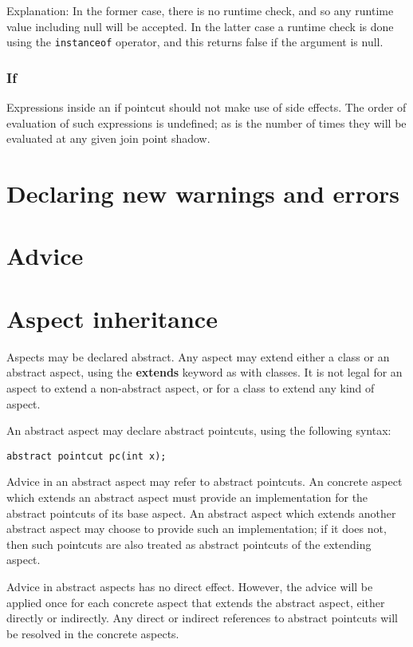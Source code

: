 \documentclass[12pt,a4paper]{report}
\begin{document}
Explanation: In the former case, there is no runtime check, and so any
runtime value including null will be accepted. In the latter case a runtime
check is done using the \verb|instanceof| operator, and this returns false
if the argument is null.


\subsection{If}
Expressions inside an if pointcut should not make use of side effects. 
The order of evaluation of such expressions is undefined; as is the number
of times they will be evaluated at any given join point shadow.

\chapter{Declaring new warnings and errors}

\chapter{Advice}

\chapter{Aspect inheritance}
Aspects may be declared abstract. Any aspect may extend either a class
or an abstract aspect, using the {\bf extends} keyword as with classes.
It is not legal for an aspect to extend a non-abstract aspect, or
for a class to extend any kind of aspect.

An abstract aspect may declare abstract pointcuts, using the following
syntax:

\begin{verbatim}
abstract pointcut pc(int x);
\end{verbatim}

Advice in an abstract
aspect may refer to abstract pointcuts. An concrete 
aspect which extends an abstract
aspect must provide an implementation for the abstract pointcuts of its
base aspect. An abstract aspect which extends another abstract aspect
may choose to provide such an implementation; if it does not, then 
such pointcuts are also treated as abstract pointcuts of the extending aspect.

Advice in abstract aspects has no direct effect. However, the advice
will be applied once for each concrete aspect that extends the abstract 
aspect, either directly or indirectly. Any direct or indirect 
references to abstract pointcuts will be resolved in the concrete aspects.
\end{document}
